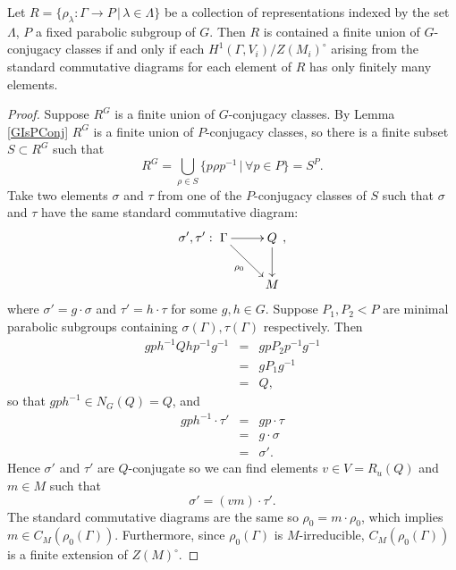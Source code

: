 \begin{lemma}\label{PConjIsHOne} Let $R=\{\rho_\lambda:\Gamma\rightarrow P\, |\, \lambda \in \Lambda\}$ be a collection of representations indexed by the set $\Lambda$, $P$ a fixed parabolic subgroup of $G$. Then $R$ is contained a finite union of $G$-conjugacy classes if and only if each $H^1(\Gamma, V_i)/Z(M_i)^\circ$ arising from the standard commutative diagrams for each element of $R$ has only finitely many elements.
\end{lemma}
\begin{proof}
	Suppose $R^G$ is a finite union of $G$-conjugacy classes. By Lemma \ref{GIsPConj} $R^G$ is a finite union of $P$-conjugacy classes, so there is a finite subset $S\subset R^G$ such that
	\begin{displaymath}
		R^G = \bigcup_{\rho \in S}\{p\rho p^{-1}\,|\,\forall p\in P\} = S^P.
	\end{displaymath}
	Take two elements $\sigma$ and $\tau$ from one of the $P$-conjugacy classes of $S$ such that $\sigma$ and $\tau$ have the same standard commutative diagram:
	\begin{displaymath}
		\sigma',\tau':\xymatrix{
			\Gamma \ar[r] \ar[rd]_{\rho_0} & Q \ar[d]\\
		& M},
	\end{displaymath}
	where $\sigma' = g\cdot\sigma$ and $\tau' = h\cdot\tau$ for some $g, h\in G$. Suppose $P_1,P_2<P$ are minimal parabolic subgroups containing $\sigma(\Gamma), \tau(\Gamma)$ respectively. Then
	\begin{eqnarray*}
		gph^{-1}Qhp^{-1}g^{-1} &=& gpP_2p^{-1}g^{-1} \\
		&=& gP_1g^{-1} \\
		&=& Q,
	\end{eqnarray*}
	so that $gph^{-1}\in N_G(Q) = Q$, and
	\begin{eqnarray*}
		gph^{-1}\cdot\tau' &=& gp\cdot \tau \\
		&=& g\cdot \sigma \\
		&=& \sigma'.
	\end{eqnarray*}
	Hence $\sigma'$ and $\tau'$ are $Q$-conjugate so we can find elements $v\in V = R_u(Q)$ and $m\in M$ such that
	\begin{displaymath}
		\sigma' = (vm)\cdot\tau'.
	\end{displaymath}
	The standard commutative diagrams are the same so $\rho_0 = m\cdot\rho_0$, which implies $m\in C_M(\rho_0(\Gamma))$. Furthermore, since $\rho_0(\Gamma)$ is $M$-irreducible, $C_M(\rho_0(\Gamma))$ is a finite extension of $Z(M)^\circ$.
	

\end{proof}
